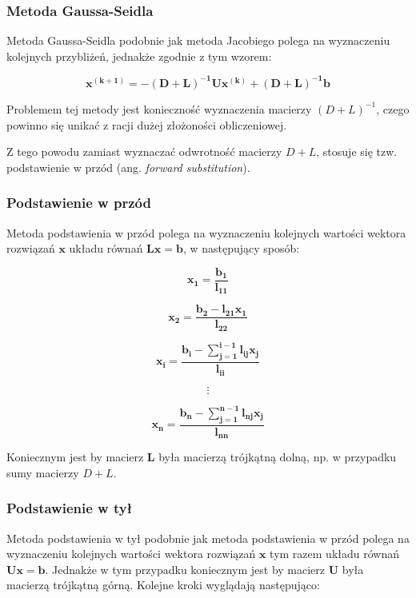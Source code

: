 \documentclass{article}
\begin{document}
\subsubsection{Metoda Gaussa-Seidla}

Metoda Gaussa-Seidla podobnie jak metoda Jacobiego polega 
na wyznaczeniu kolejnych przybliżeń, jednakże zgodnie z tym wzorem:

\begin{equation}
    \boldsymbol{x^{(k+1)} = -(D+L)^{-1}Ux^{(k)} + (D+L)^{-1}b}
\end{equation}

Problemem tej metody jest konieczność wyznaczenia macierzy $(D+L)^{-1}$,
czego powinno się unikać z racji dużej złożoności obliczeniowej.

Z tego powodu zamiast wyznaczać odwrotność macierzy $D+L$,
stosuje się tzw. podstawienie w przód (ang. \textit{forward substitution}).

\subsubsection{Podstawienie w przód}
Metoda podstawienia w przód polega na wyznaczeniu kolejnych
wartości wektora rozwiązań $\boldsymbol{x}$ układu równań $\boldsymbol{Lx = b}$,
w następujący sposób:

\begin{equation*}
    \boldsymbol{x_1 = \frac{b_1}{l_{11}}}
\end{equation*}

\begin{equation*}
    \boldsymbol{x_2 = \frac{b_2 - l_{21}x_1}{l_{22}}}
\end{equation*}

\begin{equation*}
    \boldsymbol{x_i = \frac{b_i - \sum_{j=1}^{i-1}l_{ij}x_j}{l_{ii}}}
\end{equation*}

\begin{equation*}
    \boldsymbol{\vdots}
\end{equation*}

\begin{equation*}
    \boldsymbol{x_n = \frac{b_n - \sum_{j=1}^{n-1}l_{nj}x_j}{l_{nn}}}
\end{equation*}

Koniecznym jest by macierz $\boldsymbol{L}$ była macierzą trójkątną dolną,
np. w przypadku sumy macierzy $D+L$.

\subsubsection{Podstawienie w tył}
Metoda podstawienia w tył podobnie jak metoda podstawienia w przód
polega na wyznaczeniu kolejnych wartości wektora rozwiązań $\boldsymbol{x}$ tym razem
układu równań $\boldsymbol{Ux = b}$. Jednakże w tym przypadku koniecznym jest
by macierz $\boldsymbol{U}$ była macierzą trójkątną górną.
Kolejne kroki wyglądają następująco:
\end{document}
